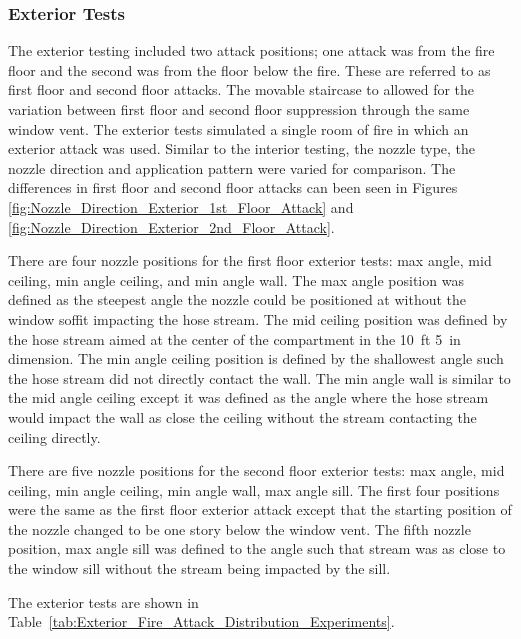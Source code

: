 \documentclass{article}
\begin{document}
\clearpage

\subsubsection{Exterior Tests}
\label{ext_tests}

The exterior testing included two attack positions; one attack was from the fire floor and the second was from the floor below the fire. These are referred to as first floor and second floor attacks. The movable staircase to allowed for the variation between first floor and second floor suppression through the same window vent. The exterior tests simulated a single room of fire in which an exterior attack was used. Similar to the interior testing, the nozzle type, the nozzle direction and application pattern were varied for comparison. The differences in first floor and second floor attacks can been seen in Figures \ref{fig:Nozzle_Direction_Exterior_1st_Floor_Attack} and \ref{fig:Nozzle_Direction_Exterior_2nd_Floor_Attack}. 

There are four nozzle positions for the first floor exterior tests: max angle, mid ceiling, min angle ceiling, and min angle wall. The max angle position was defined as the steepest angle the nozzle could be positioned at without the window soffit impacting the hose stream. The mid ceiling position was defined by the hose stream aimed at the center of the compartment in the 10~ft 5~in dimension. The min angle ceiling position is defined by the shallowest angle such the hose stream did not directly contact the wall. The min angle wall is similar to the mid angle ceiling except it was defined as the angle where the hose stream would impact the wall as close the ceiling without the stream contacting the ceiling directly.

There are five nozzle positions for the second floor exterior tests: max angle, mid ceiling, min angle ceiling, min angle wall, max angle sill. The first four positions were the same as the first floor exterior attack except that the starting position of the nozzle changed to be one story below the window vent. The fifth nozzle position, max angle sill was defined to the angle such that stream was as close to the window sill without the stream being impacted by the sill.

The exterior tests are shown in Table~\ref{tab:Exterior_Fire_Attack_Distribution_Experiments}.
\end{document}
